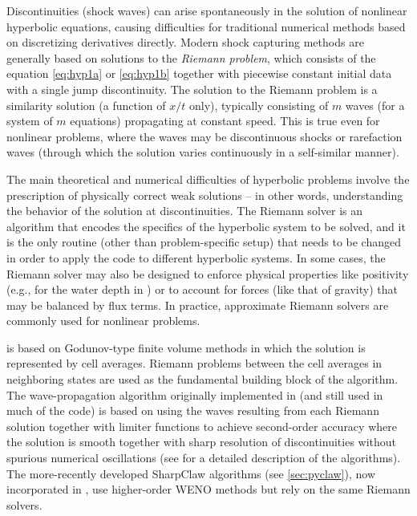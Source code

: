 Discontinuities (shock waves) can arise spontaneously in the solution of nonlinear
hyperbolic equations, causing difficulties for
traditional numerical methods based on discretizing derivatives
directly.   Modern shock capturing methods are generally based on solutions
to the {\em Riemann problem}, which consists of the equation
\cref{eq:hyp1a} or \cref{eq:hyp1b}
together with piecewise constant initial data with a single jump discontinuity.
The solution to the Riemann problem is a similarity
solution (a function of $x/t$ only),
typically consisting of $m$ waves (for a system of $m$ equations)
propagating at constant speed.  This is true even for nonlinear problems,
where the waves may be discontinuous shocks or rarefaction waves
(through which the solution varies continuously in a self-similar manner).

The main theoretical
and numerical difficulties of hyperbolic problems involve the prescription of
physically correct weak solutions -- in other words, understanding the behavior
of the solution at discontinuities.  The Riemann solver is an algorithm that
encodes the specifics of the hyperbolic system to be solved, and it is the only
routine (other than problem-specific setup) that needs to be changed in order
to apply the code to different hyperbolic systems.  In some cases, the Riemann
solver may also be designed to enforce physical properties like positivity
(e.g., for the water depth in \geoclaw) or to account for forces (like that
of gravity) that may be balanced by flux terms.
In practice, approximate Riemann solvers are commonly used for nonlinear
problems.%

\clawpack is based on Godunov-type finite volume methods in which
the solution is represented by cell averages.  Riemann problems
between the cell averages in neighboring states are used as the
fundamental building block of the algorithm.
The wave-propagation algorithm originally
implemented in \clawpack (and still used in much of the code) is based on
using the waves resulting from each Riemann solution together with limiter
functions to achieve second-order accuracy where the solution is smooth
together with sharp resolution of discontinuities without spurious numerical
oscillations (see \cite{rjl:fvmhp} for a detailed description of the
algorithms).   The more-recently developed SharpClaw algorithms (see
\cref{sec:pyclaw}), now incorporated in \pyclaw, use higher-order WENO methods
but rely on the same Riemann solvers.

